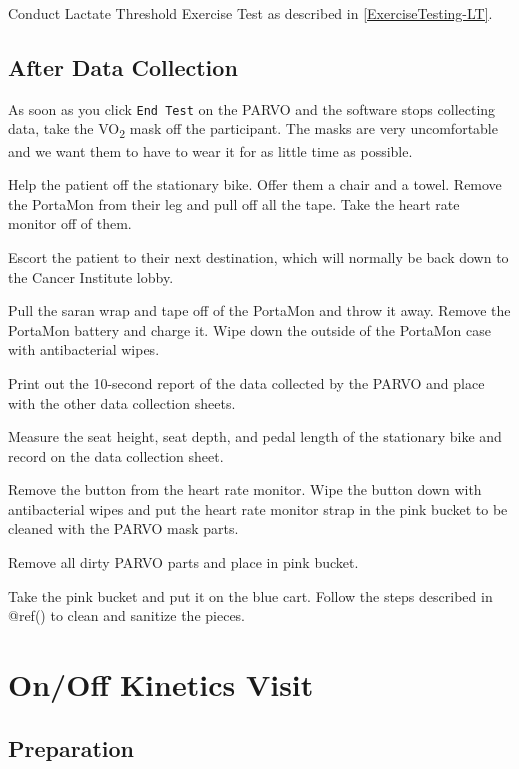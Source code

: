 \documentclass[
]{book}
\begin{document}
Conduct Lactate Threshold Exercise Test as described in \ref{ExerciseTesting-LT}.

\hypertarget{Methods-LT-after}{%
\subsection{After Data Collection}\label{Methods-LT-after}}

As soon as you click \texttt{End\ Test} on the PARVO and the software stops collecting data, take the VO\textsubscript{2} mask off the participant. The masks are very uncomfortable and we want them to have to wear it for as little time as possible.

Help the patient off the stationary bike. Offer them a chair and a towel. Remove the PortaMon from their leg and pull off all the tape. Take the heart rate monitor off of them.

Escort the patient to their next destination, which will normally be back down to the Cancer Institute lobby.

Pull the saran wrap and tape off of the PortaMon and throw it away. Remove the PortaMon battery and charge it. Wipe down the outside of the PortaMon case with antibacterial wipes.

Print out the 10-second report of the data collected by the PARVO and place with the other data collection sheets.

Measure the seat height, seat depth, and pedal length of the stationary bike and record on the data collection sheet.

Remove the button from the heart rate monitor. Wipe the button down with antibacterial wipes and put the heart rate monitor strap in the pink bucket to be cleaned with the PARVO mask parts.

Remove all dirty PARVO parts and place in pink bucket.

Take the pink bucket and put it on the blue cart. Follow the steps described in @ref() to clean and sanitize the pieces.

\hypertarget{Methods-Onoff}{%
\section{On/Off Kinetics Visit}\label{Methods-Onoff}}

\hypertarget{Methods-Onoff-Preparation}{%
\subsection{Preparation}\label{Methods-Onoff-Preparation}}
\end{document}
